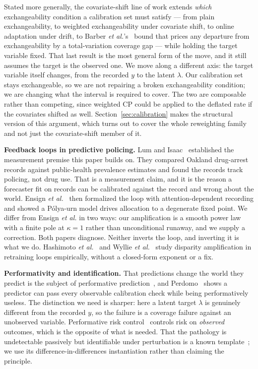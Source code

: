 \documentclass[journal,10pt,twocolumn]{IEEEtran}
\begin{document}
Stated more generally, the covariate-shift line of work extends \emph{which}
exchangeability condition a calibration set must satisfy --- from plain
exchangeability, to weighted exchangeability under covariate shift, to online
adaptation under drift, to Barber \emph{et al.}'s~\cite{barber2023conformal}
bound that prices any departure from exchangeability by a total-variation
coverage gap --- while holding the target variable fixed. That last result is the
most general form of the move, and it still assumes the target is the observed
one. We move along a different axis: the target variable itself changes, from the
recorded $y$ to the latent $\lambda$. Our calibration set stays exchangeable, so
we are not repairing a broken exchangeability condition; we are changing what the
interval is required to cover. The two are composable rather than competing, since
weighted CP could be applied to the deflated rate if the covariates shifted as
well.
Section~\ref{sec:calibration} makes the structural version of this argument, which
turns out to cover the whole reweighting family and not just the covariate-shift
member of it.

\textbf{Feedback loops in predictive policing.} Lum and
Isaac~\cite{lum2016predict} established the measurement premise this paper builds
on. They compared Oakland drug-arrest records against public-health prevalence
estimates and found the records track policing, not drug use. That is a
measurement claim, and it is the reason a forecaster fit on records can be
calibrated against the record and wrong about the world. Ensign
\emph{et al.}~\cite{ensign2018runaway} then formalized the loop with
attention-dependent recording and showed a P\'olya-urn model drives allocation to
a degenerate fixed point. We differ from Ensign \emph{et al.} in two ways: our
amplification is a smooth power law with a finite pole at $\kappa = 1$ rather than
unconditional runaway, and we supply a correction. Both papers diagnose. Neither
inverts the loop, and inverting it is what we do. Hashimoto
\emph{et al.}~\cite{hashimoto2018fairness} and Wyllie
\emph{et al.}~\cite{wyllie2024fairness} study disparity amplification in
retraining loops empirically, without a closed-form exponent or a fix.

\textbf{Performativity and identification.} That predictions change the world
they predict is the subject of performative
prediction~\cite{perdomo2020performative}, and Perdomo~\cite{perdomo2025revisiting}
shows a predictor can pass every observable calibration check while being
performatively useless. The distinction we need is sharper: here a latent target
$\lambda$ is genuinely different from the recorded $y$, so the failure is a
coverage failure against an unobserved variable. Performative risk
control~\cite{li2025performative} controls risk on \emph{observed} outcomes,
which is the opposite of what is needed. That the pathology is undetectable
passively but identifiable under perturbation is a known
template~\cite{mendler2022anticipating}; we use its difference-in-differences
instantiation rather than claiming the principle.
\end{document}

